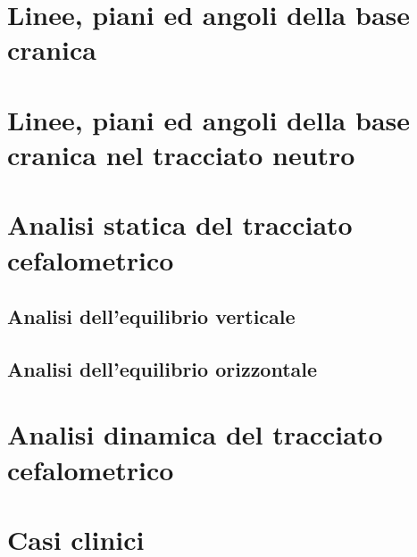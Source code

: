 \section{Linee, piani ed angoli della base cranica}
\section{Linee, piani ed angoli della base cranica nel tracciato neutro}
\section{Analisi statica del tracciato cefalometrico}
\subsection{Analisi dell'equilibrio verticale}
\subsection{Analisi dell'equilibrio orizzontale}
\section{Analisi dinamica del tracciato cefalometrico}
\section{Casi clinici}